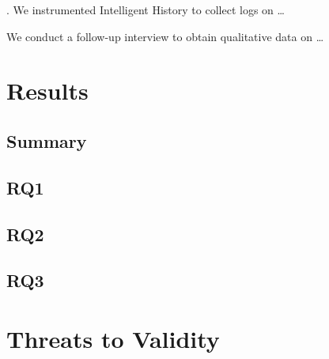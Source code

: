 . We instrumented Intelligent History to collect logs on \dots

 We conduct a follow-up interview to obtain qualitative data on \dots

\section{Results}
\label{sec:Results}

\subsection{Summary}


\subsection{RQ1}

\subsection{RQ2}

\subsection{RQ3}

\section{Threats to Validity}
\label{sec:Threads-to-Validity}


\endinput

Any text after an \endinput is ignored.
You could put scraps here or things in progress.